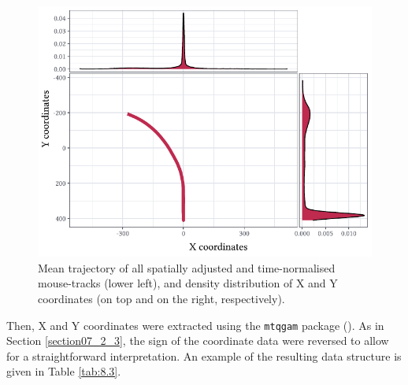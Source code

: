 \begin{figure}
    \centering
    \includegraphics[]{figures/fig8.2.pdf}
    \caption{Mean trajectory of all spatially adjusted and time-normalised mouse-tracks (lower left), and density distribution of X and Y coordinates (on top and on the right, respectively).}
    \label{fig:8_2}
\end{figure}

Then, X and Y coordinates were extracted using the \texttt{mtqgam} package (\cite{Schmitz2021mtqgam}). As in Section \ref{section07_2_3}, the sign of the coordinate data were reversed to allow for a straightforward interpretation. An example of the resulting data structure is given in Table \ref{tab:8.3}.

